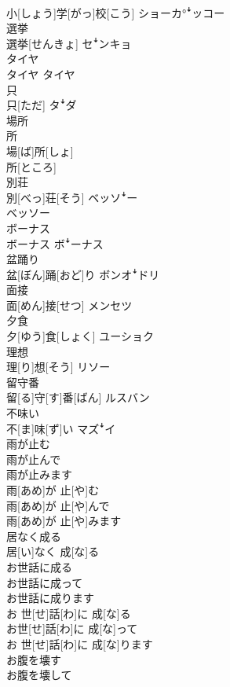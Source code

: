 \documentclass[8pt]{extreport}
\begin{document}
\begin{CJK}{UTF8}{min}
\\	小[しょう]学[がっ]校[こう]	ショーカ°ꜜッコー
\\	選挙	
\\	選挙[せんきょ]	セꜜンキョ
\\	タイヤ	
\\	タイヤ	タイヤ
\\	只	
\\	只[ただ]	タꜜダ
\\	場所 
\\	所	
\\	場[ば]所[しょ] 
\\	所[ところ]	
\\	別荘	
\\	別[べっ]荘[そう]	ベッソꜜー 
\\	ベッソー
\\	ボーナス	
\\	ボーナス	ボꜜーナス
\\	盆踊り	
\\	盆[ぼん]踊[おど]り	ボンオꜜドリ
\\	面接	
\\	面[めん]接[せつ]	メンセツ
\\	夕食	
\\	夕[ゆう]食[しょく]	ユーショク
\\	理想	
\\	理[り]想[そう]	リソー
\\	留守番	
\\	留[る]守[す]番[ばん]	ルスバン
\\	不味い	
\\	不[ま]味[ず]い	マズꜜイ
\\	雨が止む 
\\	雨が止んで 
\\	雨が止みます	
\\	雨[あめ]が 止[や]む 
\\	雨[あめ]が 止[や]んで 
\\	雨[あめ]が 止[や]みます	
\\	居なく成る	
\\	居[い]なく 成[な]る	
\\	お世話に成る 
\\	お世話に成って 
\\	お世話に成ります	
\\	お 世[せ]話[わ]に 成[な]る 
\\	お世[せ]話[わ]に 成[な]って 
\\	お 世[せ]話[わ]に 成[な]ります	
\\	お腹を壊す 
\\	お腹を壊して 

\end{CJK}
\end{document}
